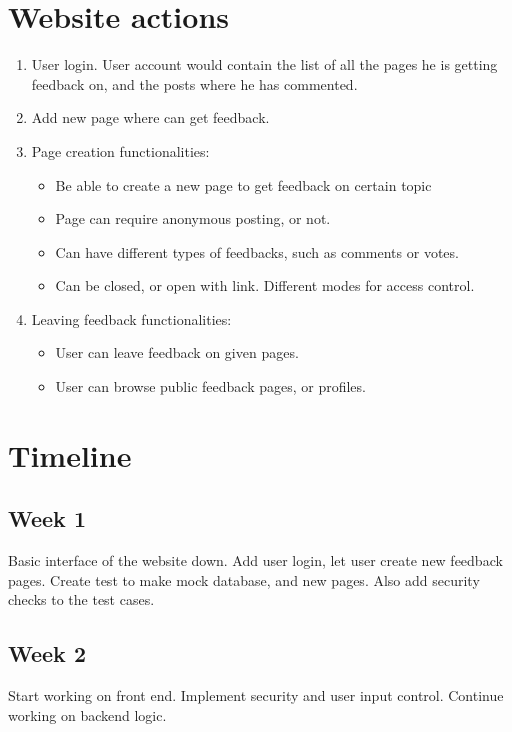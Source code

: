\documentclass[a4paper]{article}
\begin{document}
\section{Website actions} %
\label{sec:Technical Specificatio}
\begin{enumerate}
  \item User login. User account would contain the list of all the pages he is getting feedback on, and the posts where he has commented.
  \item Add new page where can get feedback.
  \item Page creation functionalities:
    \begin{itemize}
      \item Be able to create a new page to get feedback on certain topic 
      \item Page can require anonymous posting, or not.
      \item Can have different types of feedbacks, such as comments or votes.
      \item Can be closed, or open with link. Different modes for access control.
    \end{itemize}
  \item Leaving feedback functionalities:
    \begin{itemize}
      \item User can leave feedback on given pages.
      \item User can browse public feedback pages, or profiles.
    \end{itemize}
\end{enumerate}
\section{Timeline} %
\label{sec:Timeline}
\subsection{Week 1} %
\label{sub:Week 1}
Basic interface of the website down. Add user login, let user create new feedback pages. Create test to make mock database, and new pages. Also add security checks to the test cases.
\subsection{Week 2} %
\label{sub:Week 2}
Start working on front end. Implement security and user input control. Continue working on backend logic.
\end{document}
